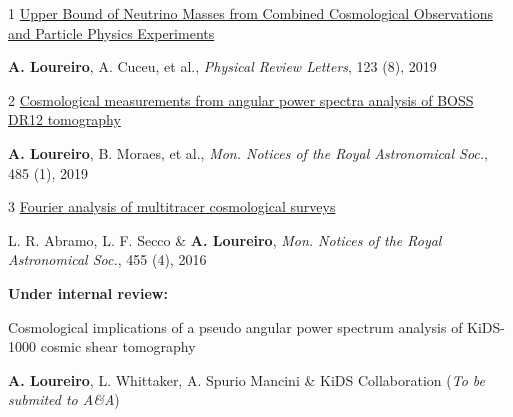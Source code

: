 
\vspace{0.4cm}
\begin{cvitems}
\item[1] \href{https://arxiv.org/abs/1811.02578}{\footnotesize{Upper Bound of Neutrino Masses from Combined Cosmological Observations and Particle Physics Experiments}}  

\footnotesize{\textbf{A. Loureiro}, A. Cuceu, et al., \textit{Physical Review Letters}, 123 (8), 2019}

\item[2] \href{https://arxiv.org/abs/1809.07204}{\footnotesize{Cosmological measurements from angular power spectra analysis of BOSS DR12 tomography}}

\footnotesize{\textbf{A. Loureiro}, B. Moraes, et al., \textit{Mon. Notices of the Royal Astronomical Soc.}, 485 (1), 2019}

\item[3] \href{https://arxiv.org/abs/1505.04106}{\footnotesize{Fourier analysis of multitracer cosmological surveys}}

\footnotesize{L. R. Abramo, L. F. Secco \& \textbf{A. Loureiro}, \textit{Mon. Notices of the Royal Astronomical Soc.}, 455 (4), 2016}

\vspace{0.4cm}
\hspace{-0.4cm}\textbf{Under internal review:}

\item \footnotesize{  Cosmological implications of a pseudo angular power spectrum analysis of KiDS-1000 cosmic shear tomography}

\footnotesize{\textbf{A. Loureiro}, L. Whittaker, A. Spurio Mancini \& KiDS Collaboration (\textit{To be submited to A\&A})}

\vspace{0.4cm}
\end{cvitems}




